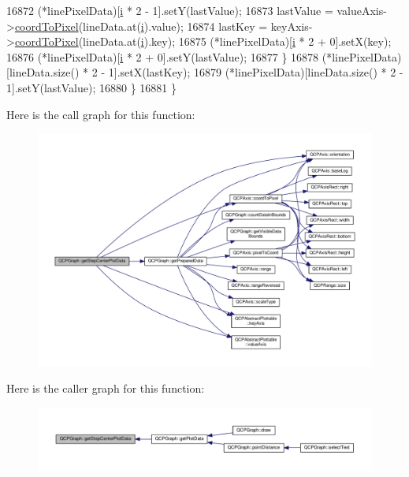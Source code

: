 \begin{DoxyCode}
16872       (*linePixelData)[\hyperlink{_comparision_pictures_2_createtest_image_8m_a6f6ccfcf58b31cb6412107d9d5281426}{i} * 2 - 1].setY(lastValue);
16873       lastValue = valueAxis->\hyperlink{class_q_c_p_axis_a985ae693b842fb0422b4390fe36d299a}{coordToPixel}(lineData.at(\hyperlink{_comparision_pictures_2_createtest_image_8m_a6f6ccfcf58b31cb6412107d9d5281426}{i}).value);
16874       lastKey = keyAxis->\hyperlink{class_q_c_p_axis_a985ae693b842fb0422b4390fe36d299a}{coordToPixel}(lineData.at(\hyperlink{_comparision_pictures_2_createtest_image_8m_a6f6ccfcf58b31cb6412107d9d5281426}{i}).key);
16875       (*linePixelData)[\hyperlink{_comparision_pictures_2_createtest_image_8m_a6f6ccfcf58b31cb6412107d9d5281426}{i} * 2 + 0].setX(key);
16876       (*linePixelData)[\hyperlink{_comparision_pictures_2_createtest_image_8m_a6f6ccfcf58b31cb6412107d9d5281426}{i} * 2 + 0].setY(lastValue);
16877     \}
16878     (*linePixelData)[lineData.size() * 2 - 1].setX(lastKey);
16879     (*linePixelData)[lineData.size() * 2 - 1].setY(lastValue);
16880   \}
16881 \}
\end{DoxyCode}


Here is the call graph for this function\+:\nopagebreak
\begin{figure}[H]
\begin{center}
\leavevmode
\includegraphics[width=350pt]{class_q_c_p_graph_ad3713e7d8eb85a0afc34a81a5db5cd27_cgraph}
\end{center}
\end{figure}




Here is the caller graph for this function\+:\nopagebreak
\begin{figure}[H]
\begin{center}
\leavevmode
\includegraphics[width=350pt]{class_q_c_p_graph_ad3713e7d8eb85a0afc34a81a5db5cd27_icgraph}
\end{center}
\end{figure}


